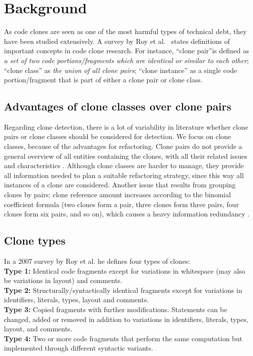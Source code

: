 \documentclass[a4paper]{article}
\begin{document}
\section{Background}\label{chap:background}
As code clones are seen as one of the most harmful types of technical debt, they have been studied extensively. A survey by Roy et al.~\cite{roy2007survey} states definitions of important concepts in code clone research. For instance, ``clone pair''is defined as \textit{a set of two code portions/fragments which are identical or similar to each other}; ``clone class'' as \textit{the union of all clone pairs}; ``clone instance'' as a single code portion/fragment that is part of either a clone pair or clone class.

\subsection{Advantages of clone classes over clone pairs}\label{chap:cloneclasses}
Regarding clone detection, there is a lot of variability in literature whether clone pairs or clone classes should be considered for detection. We focus on clone classes, because of the advantages for refactoring. Clone pairs do not provide a general overview of all entities containing the clones, with all their related issues and characteristics \cite{fontana2012duplicated}. Although clone classes are harder to manage, they provide all information needed to plan a suitable refactoring strategy, since this way all instances of a clone are considered. Another issue that results from grouping clones by pairs: clone reference amount increases according to the binomial coefficient formula (two clones form a pair, three clones form three pairs, four clones form six pairs, and so on), which causes a heavy information redundancy \cite{fontana2012duplicated}.

\subsection{Clone types}\label{chap:backgroundclonetypes}
In a 2007 survey by Roy et al. \cite{roy2007survey} he defines four types of clones:\\
\textbf{Type 1:} Identical code fragments except for variations in whitespace (may also be variations in layout) and comments.\\
\textbf{Type 2:} Structurally/syntactically identical fragments except for variations in identifiers, literals, types, layout and comments.\\
\textbf{Type 3:} Copied fragments with further modifications. Statements can be changed, added or removed in addition to variations in identifiers, literals, types, layout, and comments.\\
\textbf{Type 4:} Two or more code fragments that perform the same computation but implemented through different syntactic variants.
\end{document}
